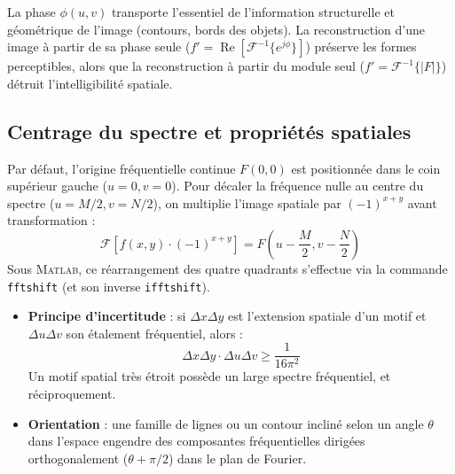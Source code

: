 \begin{remark}
    La phase $\phi(u,v)$ transporte l'essentiel de l'information structurelle et géométrique de l'image (contours, bords des objets). La reconstruction d'une image à partir de sa phase seule ($f' = \operatorname{Re}[\mathcal{F}^{-1}\{e^{j \phi}\}]$) préserve les formes perceptibles, alors que la reconstruction à partir du module seul ($f' = \mathcal{F}^{-1}\{|F|\}$) détruit l'intelligibilité spatiale.
\end{remark}

\subsection{Centrage du spectre et propriétés spatiales}

\begin{proposition}
    Par défaut, l'origine fréquentielle continue $F(0,0)$ est positionnée dans le coin supérieur gauche ($u=0, v=0$).
    Pour décaler la fréquence nulle au centre du spectre ($u = M/2, v = N/2$), on multiplie l'image spatiale par $(-1)^{x+y}$ avant transformation :
    \begin{equation}
        \mathcal{F}\left[ f(x,y) \cdot (-1)^{x+y} \right] = F\left(u - \frac{M}{2}, v - \frac{N}{2}\right)
    \end{equation}
    Sous \textsc{Matlab}, ce réarrangement des quatre quadrants s'effectue via la commande \texttt{fftshift} (et son inverse \texttt{ifftshift}).
\end{proposition}

\begin{proposition}
    \begin{itemize}
        \item \textbf{Principe d'incertitude} : si $\Delta x \Delta y$ est l'extension spatiale d'un motif et $\Delta u \Delta v$ son étalement fréquentiel, alors :
            \begin{equation}
                \Delta x \Delta y \cdot \Delta u \Delta v \geqslant \frac{1}{16\pi^2}
            \end{equation}
            Un motif spatial très étroit possède un large spectre fréquentiel, et réciproquement.
        \item \textbf{Orientation} : une famille de lignes ou un contour incliné selon un angle $\theta$ dans l'espace engendre des composantes fréquentielles dirigées orthogonalement ($\theta + \pi/2$) dans le plan de Fourier.
    \end{itemize}
\end{proposition}

